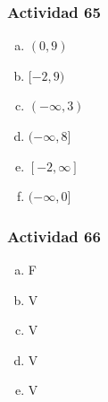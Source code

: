 \documentclass[a4paper, twocolumn]{article}
\begin{document}
\subsubsection*{Actividad 65}
\begin{enumerate}[a)]
		  \item $(0,9)$
		  \item $[-2,9)$
		  \item $(-\infty,3)$
		  \item $(-\infty,8]$
		  \item $[-2,\infty]$
		  \item $(-\infty,0]$
\end{enumerate}
\subsubsection*{Actividad 66}
\begin{enumerate}[a)]
		  \item F
		  \item V
		  \item V
		  \item V
		  \item V
\end{enumerate}





\end{document}
